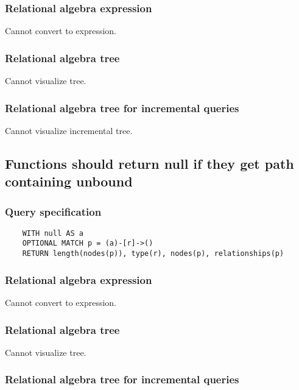	\subsubsection*{Relational algebra expression}

	Cannot convert to expression.

	\subsubsection*{Relational algebra tree}

	Cannot visualize tree.

	\subsubsection*{Relational algebra tree for incremental queries}

	Cannot visualize incremental tree.
	\subsection{Functions should return null if they get path containing unbound}

	\subsubsection*{Query specification}

	\begin{lstlisting}
	WITH null AS a
	OPTIONAL MATCH p = (a)-[r]->()
	RETURN length(nodes(p)), type(r), nodes(p), relationships(p)
	\end{lstlisting}


	\subsubsection*{Relational algebra expression}

	Cannot convert to expression.

	\subsubsection*{Relational algebra tree}

	Cannot visualize tree.

	\subsubsection*{Relational algebra tree for incremental queries}

